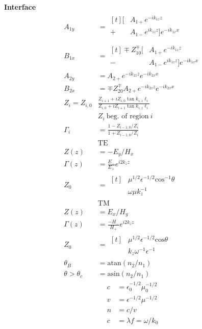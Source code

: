 \documentclass[12pt]{article}
\begin{document}
\begin{multicols}{3}
\textbf{Interface}
\begin{align}
  A_{1y} &= \begin{aligned}[t]
    [ &A_{1+}e^{-ik_{1z}z} \\
    + &A_{1-}e^{ik_{1z}z}]e^{-ik_{1x}x}\\
  \end{aligned}\\
  B_{1x} &= \begin{aligned}[t]
    \mp Z_{10}^{\mp}[&A_{1+}e^{-ik_{1z}z} \\
      - &A_{1-}e^{ik_{1z}z}]e^{-ik_{1x}x}
  \end{aligned}\\
  A_{2y} &= A_{2+}e^{-ik_{2z}z}e^{-ik_{2x}x}\\
  B_{2x} &=\mp Z_{20}^{\mp}A_{2+}e^{-ik_{2z}z}e^{-ik_{2x}x}\\
  Z_i = Z_{i, 0}&\frac{Z_{i + 1} + i Z_{i, 0}\tan k_{i,z} \ell_i}{Z_{i, 0} + iZ_{i + 1}\tan k_{i,z} \ell_i}\\
  &Z_i \ \textrm{beg. of region} \ i \\
  \Gamma_i &= \frac{1 - Z_{i - 1, 0}/Z_{i}}{1 + Z_{i - 1, 0}/Z_{i}}\\
  &\textrm{TE}\\
  Z(z) &= -E_y/H_x\\
  \Gamma(z) &= \frac{E_-}{E_+} e^{i2k_zz}\\
  Z_0 &= \begin{aligned}[t]
    &\mu^{1/2}\epsilon^{-1/2}\textrm{cos}^{-1}\theta\\
    &\omega\mu k_z^{-1}
  \end{aligned}\\
  &\textrm{TM}\\
  Z(z) &= E_x/H_y\\
  \Gamma(z) &= \frac{-H_-}{H_+} e^{i2k_zz}\\
  Z_0 &= \begin{aligned}[t]
    &\mu^{1/2}\epsilon^{-1/2}\textrm{cos}\theta\\
    &k_z\omega^{-1}\epsilon^{-1}
  \end{aligned}\\
  \theta_B &= \textrm{atan}(n_2/n_1)\\
  \theta > \theta_c &= \textrm{asin}(n_2/n_1)
\end{align}
\begin{align}
  c &= \epsilon^{-1/2}_0\mu^{-1/2}_0\\
  v &= \epsilon^{-1/2}\mu^{-1/2}\\
  n &= c/v\\
  c &= \lambda f = \omega/k_0
\end{align}


\end{multicols}
\end{document}
